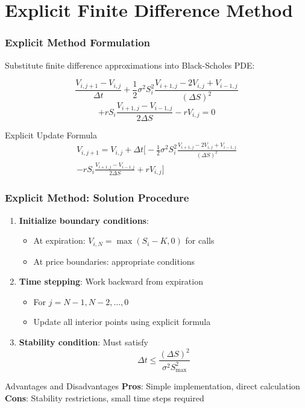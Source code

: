 \documentclass{beamer}
\begin{document}
\section{Explicit Finite Difference Method}

\begin{frame}
\frametitle{Explicit Method Formulation}
Substitute finite difference approximations into Black-Scholes PDE:

\[\frac{V_{i,j+1} - V_{i,j}}{\Delta t} + \frac{1}{2}\sigma^2 S_i^2 \frac{V_{i+1,j} - 2V_{i,j} + V_{i-1,j}}{(\Delta S)^2}\]
\[+ rS_i \frac{V_{i+1,j} - V_{i-1,j}}{2\Delta S} - rV_{i,j} = 0\]

\begin{block}{Explicit Update Formula}
\begin{multline}
V_{i,j+1} = V_{i,j} + \Delta t \bigg[ -\frac{1}{2}\sigma^2 S_i^2 \frac{V_{i+1,j} - 2V_{i,j} + V_{i-1,j}}{(\Delta S)^2} \\
- rS_i \frac{V_{i+1,j} - V_{i-1,j}}{2\Delta S} + rV_{i,j} \bigg]
\end{multline}
\end{block}
\end{frame}

\begin{frame}
\frametitle{Explicit Method: Solution Procedure}
\begin{enumerate}
\item \textbf{Initialize boundary conditions}:
   \begin{itemize}
   \item At expiration: \(V_{i,N} = \max(S_i - K, 0)\) for calls
   \item At price boundaries: appropriate conditions
   \end{itemize}

\item \textbf{Time stepping}: Work backward from expiration
   \begin{itemize}
   \item For \(j = N-1, N-2, \ldots, 0\)
   \item Update all interior points using explicit formula
   \end{itemize}

\item \textbf{Stability condition}: Must satisfy
   \[\Delta t \leq \frac{(\Delta S)^2}{\sigma^2 S_{\max}^2}\]
\end{enumerate}

\begin{block}{Advantages and Disadvantages}
\textbf{Pros}: Simple implementation, direct calculation\\
\textbf{Cons}: Stability restrictions, small time steps required
\end{block}
\end{frame}
\end{document}
